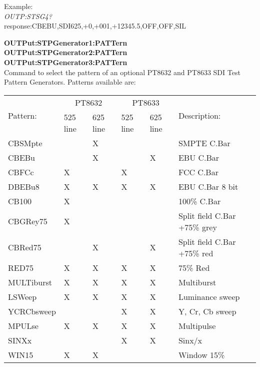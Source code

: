 Example:\\
\textit{OUTP:STSG4?}\\
response:CBEBU,SDI625,+0,+001,+12345.5,OFF,OFF,SIL

\textbf{OUTPut:STPGenerator1:PATTern}\\
\textbf{OUTPut:STPGenerator2:PATTern}\\
\textbf{OUTPut:STPGenerator3:PATTern}\\
Command to select the pattern of an optional PT8632 and PT8633 SDI Test Pattern Generators. Patterns available are:

\begin{tabular}{|l|l|l|l|l|l|}
\hline
\multirow{2}{*}{Pattern:} & \multicolumn{2}{|c|}{PT8632} & \multicolumn{2}{|c|}{PT8633} & \multirow{2}{*}{Description:} \\ \cline{2-5}
 													& 525 line & 625 line					 & 525 line & 625 line & \\ \hline
CBSMpte										&						&		X					& 					&						&	SMPTE C.Bar \\ \hline
CBEBu											&						& X						&						& X					& EBU C.Bar\\ \hline
CBFCc											& X					&							& X					&						& FCC C.Bar\\ \hline
DBEBu8										& X					& X						& X					& X					& EBU C.Bar 8 bit\\ \hline
CB100											& X					&							&						&						& 100\% C.Bar\\ \hline
CBGRey75									& X					&							& 					&						& Split field C.Bar +75\% grey\\ \hline
CBRed75										&						& X						&						& X					& Split field C.Bar +75\% red\\ \hline
RED75											& X					& X						&	X					& X					& 75\% Red\\ \hline
MULTiburst								& X					& X						& X					& X					& Multiburst\\ \hline
LSWeep										& X					& X						& X					& X					& Luminance sweep\\ \hline
YCRCbsweep								&						&							& X					& X					& Y, Cr, Cb sweep\\ \hline
MPULse										& X					& X						& X					& X					& Multipulse\\ \hline
SINXx											&  					&  						&	X					&	X					& Sinx/x\\ \hline
WIN15											& X					& X						&						&						& Window 15\%\\ \hline

\end{tabular}
